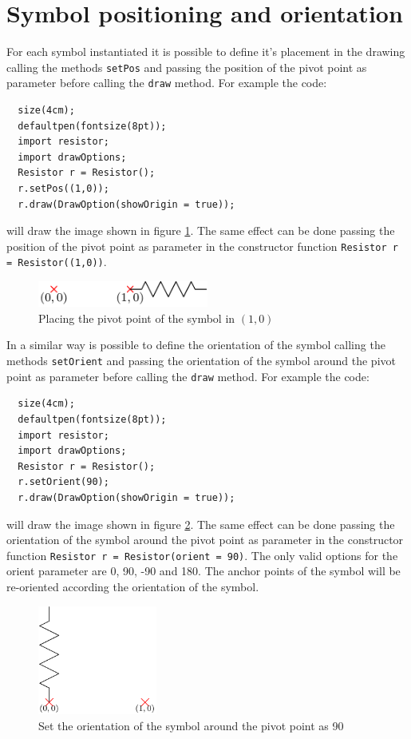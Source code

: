 \documentclass[a4paper,12pt]{report}
\begin{document}
\section*{Symbol positioning and orientation}
For each symbol instantiated it is possible to define it's placement in the drawing calling the methods \texttt{setPos} and passing the position of the pivot point as parameter before calling the \texttt{draw} method. For example the code:
\begin{lstlisting}
  size(4cm);
  defaultpen(fontsize(8pt));
  import resistor;
  import drawOptions;
  Resistor r = Resistor();
  r.setPos((1,0));
  r.draw(DrawOption(showOrigin = true));
\end{lstlisting}
will draw the image shown in figure \ref{placingExample1}. The same effect can be done passing the position of the pivot point as parameter in the constructor function \texttt{Resistor r = Resistor((1,0))}.
\begin{figure}[ht]
  \centering
  \includegraphics[width=0.5\textwidth]{placingExample1.pdf}
  \caption{Placing the pivot point of the symbol in $(1,0)$}
  \label{placingExample1}
\end{figure}

In a similar way is possible to define the orientation of the symbol calling the methods \texttt{setOrient} and passing the orientation of the symbol around the pivot point as parameter before calling the \texttt{draw} method. For example the code:
\begin{lstlisting}
  size(4cm);
  defaultpen(fontsize(8pt));
  import resistor;
  import drawOptions;
  Resistor r = Resistor();
  r.setOrient(90);
  r.draw(DrawOption(showOrigin = true));
\end{lstlisting}
will draw the image shown in figure \ref{placingExample2}. The same effect can be done passing the orientation of the symbol around the pivot point as parameter in the constructor function \texttt{Resistor r = Resistor(orient = 90)}. The only valid options for the orient parameter are 0, 90, -90  and 180. The anchor points of the symbol will be re-oriented according the orientation of the symbol.
\begin{figure}[ht]
  \centering
  \includegraphics[width=0.35\textwidth]{placingExample2.pdf}
  \caption{Set the orientation of the symbol around the pivot point as 90}
  \label{placingExample2}
\end{figure}
\end{document}
